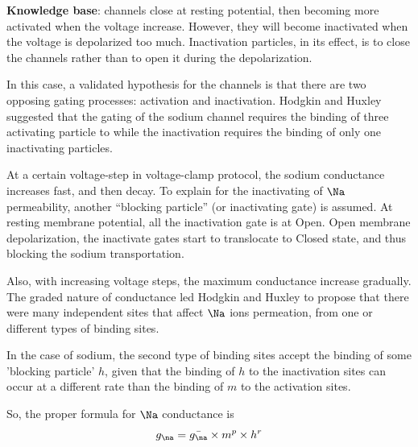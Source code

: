 
{\bf Knowledge base}:  channels close at resting potential,
then becoming more activated when the voltage increase. However, they
will become inactivated when the voltage is depolarized too much.
Inactivation particles, in its effect, is to close the channels rather
than to open it during the depolarization.

In this case, a validated hypothesis for the  channels is that
there are two opposing gating processes: activation and inactivation.
Hodgkin and Huxley suggested that the gating of the sodium channel
requires the binding of three activating particle to while the
inactivation requires the binding of only one inactivating particles.



At a certain voltage-step in voltage-clamp protocol, the sodium conductance
increases fast, and then decay. To explain for the inactivating of $\Na$
permeability, another ``blocking particle'' (or inactivating gate) is assumed.
At resting membrane potential, all the inactivation gate is at Open. Open
membrane depolarization, the inactivate gates start to translocate to Closed
state, and thus blocking the sodium transportation.

Also, with increasing voltage steps, the maximum conductance increase gradually.
The graded nature of conductance led Hodgkin and Huxley to propose that
there were many independent sites that affect $\Na$ ions permeation, from one or
different types of binding sites. 

In the case of sodium, the second type of binding sites accept the binding of
some 'blocking particle' $h$, given that the binding of $h$ to the inactivation
sites can occur at a different rate than the binding of $m$ to the activation
sites. 

So, the proper formula for $\Na$ conductance is 
\begin{equation}
g_\na = \bar{g_\na} \times m^p \times h^r
\end{equation}

